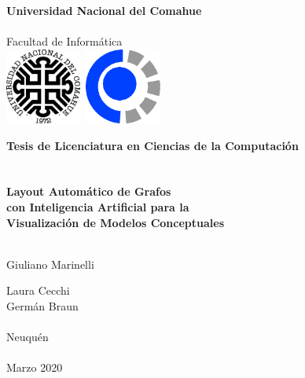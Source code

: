 
\titlepage

\begin{center}
\ \\
\ \\
\vspace{-1cm}
 

\ \\

\vspace{0.5cm}
{\Large{\bf \sc Universidad Nacional del Comahue}}\\

\ \\
{\Large { \sc Facultad de Informática}}\\

\vspace{-2.5cm}
\mbox{\hspace{-1cm}\includegraphics[width=2.5cm,height=2.5cm]{imagenes/unc.png}\hspace{13cm} \includegraphics[width=2.5cm,height=2.5cm]{imagenes/fai.png}}


\vspace{6cm}

{\Large {\bf\sc Tesis de Licenciatura en Ciencias de la Computaci\'on}}\\
\ \\
\ \\
{\LARGE {\bf Layout Automático de Grafos \\con  Inteligencia Artificial para la \\Visualización de Modelos Conceptuales \\
}}\ \\
\vspace{3cm}



{\Large Giuliano Marinelli}\\
\vspace{2cm}

{\Large Laura Cecchi}\\

{\Large Germán Braun}\\
\ \\



\vfill
{\Large {\sc Neuqu\'en}\hspace{6cm}{\sc Argentina}}\\
\ \\

{\Large Marzo 2020}\\

\end{center}

\pagebreak

